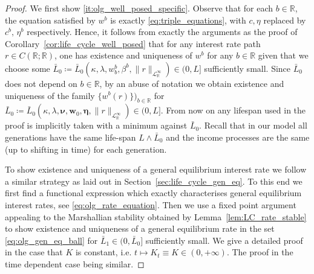 \documentclass[11pt,oneside,english,reqno,dvipsnames,table]{amsart}
\numberwithin{equation}{section}
\theoremstyle{plain}
\theoremstyle{definition}
\theoremstyle{remark}
\theoremstyle{plain}
\theoremstyle{plain}
\theoremstyle{plain}
\theoremstyle{plain}
\theoremstyle{plain}
\theoremstyle{plain}
\theoremstyle{plain}
\newcommand{\bw}{\mathbf{w}}
\newcommand{\mbR}{\mathbb{R}}
\newcommand{\msL}{\mathscr{L}}
\newcommand{\bmeta}{\boldsymbol{\eta}}
\newcommand{\bnu}{\boldsymbol{\nu}}
\numberwithin{thm}{section}
\begin{document}
%
\begin{proof}
We first show \ref{it:olg_well_posed_specific}. Observe that for each $b\in \mbR$, the equation satisfied by $w^b$ is exactly \eqref{eq:triple_equations}, with $c,\eta$ replaced by $c^b,\, \eta^b$ respectively. Hence, it follows from exactly the arguments as the proof of Corollary~\ref{cor:life_cycle_well_posed} that for any interest rate path $r\in C(\mbR;\mbR)$, one has existence and uniqueness of $w^b$ for any $b\in \mbR$ given that we choose some $\bar{L}_0\coloneqq \bar{L}_0(\kappa,\lambda,w^b_b,\beta^b,\|r\|_{\msL^\infty_\mbR}) \in (0,L]$ sufficiently small. Since $\bar{L}_0$ does not depend on $b\in \mbR$, by an abuse of notation we obtain existence and uniqueness of the family $\{w^b(r)\})_{b\in \mbR}$ for $\bar{L}_0 \coloneqq \bar{L}_0(\kappa,\lambda,\bnu, \bw_0,\bmeta,\|r\|_{\msL^\infty_\mbR}) \in (0,L]$. From now on any lifespan used in the proof is implicitly taken with a minimum against $\bar{L}_0$. Recall that in our model all generations have the same life-span $L \wedge \bar{L}_0$ and the income processes are the same (up to shifting in time) for each generation. %

    To show existence and uniqueness of a general equilibrium interest rate we follow a similar strategy as laid out in Section~\ref{sec:life_cycle_gen_eq}. To this end we first find a functional expression which exactly characterises general equilibrium interest rates, see \eqref{eq:olg_rate_equation}. Then we use a fixed point argument appealing to the Marshallian stability  obtained by Lemma~\ref{lem:LC_rate_stable} to show existence and uniqueness of a general equilibrium rate in the set \eqref{eq:olg_gen_eq_ball} for $\bar{L}_1 \in (0,\bar{L}_0]$ sufficiently small. We give a detailed proof in the case that $K$ is constant, i.e. $t\mapsto K_t\equiv K\in (0,+\infty)$.  The proof in the time dependent case being similar. 
    

\end{proof}
\end{document}
